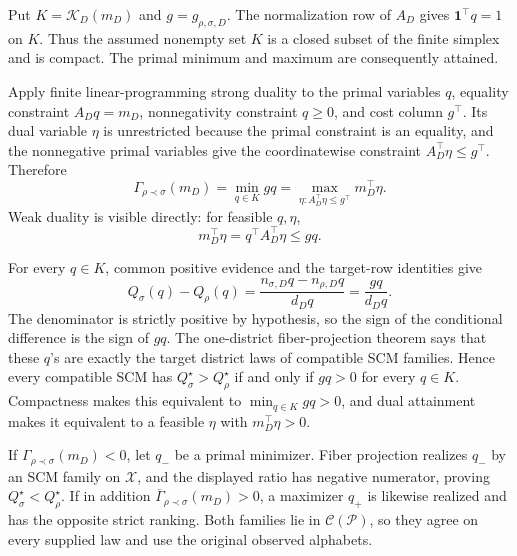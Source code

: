 Put \(K=\mathcal K_D(m_D)\) and \(g=g_{\rho,\sigma,D}\).  The normalization row of \(A_D\) gives \(\mathbf 1^\top q=1\) on \(K\).  Thus the assumed nonempty set \(K\) is a closed subset of the finite simplex and is compact.  The primal minimum and maximum are consequently attained.

Apply finite linear-programming strong duality to the primal variables \(q\), equality constraint \(A_Dq=m_D\), nonnegativity constraint \(q\geq0\), and cost column \(g^\top\).  Its dual variable \(\eta\) is unrestricted because the primal constraint is an equality, and the nonnegative primal variables give the coordinatewise constraint \(A_D^\top\eta\leq g^\top\).  Therefore
\[
 \Gamma_{\rho\prec\sigma}(m_D)
 =\min_{q\in K}gq
 =\max_{\eta:A_D^\top\eta\leq g^\top}m_D^\top\eta.
\]
Weak duality is visible directly: for feasible \(q,\eta\),
\[
 m_D^\top\eta=q^\top A_D^\top\eta\leq gq.
\]

For every \(q\in K\), common positive evidence and the target-row identities give
\[
 Q_\sigma(q)-Q_\rho(q)
 =\frac{n_{\sigma,D}q-n_{\rho,D}q}{d_Dq}
 =\frac{gq}{d_Dq}.
\]
The denominator is strictly positive by hypothesis, so the sign of the conditional difference is the sign of \(gq\).  The one-district fiber-projection theorem says that these \(q\)'s are exactly the target district laws of compatible SCM families.  Hence every compatible SCM has \(Q_\sigma^\star>Q_\rho^\star\) if and only if \(gq>0\) for every \(q\in K\).  Compactness makes this equivalent to \(\min_{q\in K}gq>0\), and dual attainment makes it equivalent to a feasible \(\eta\) with \(m_D^\top\eta>0\).

If \(\Gamma_{\rho\prec\sigma}(m_D)<0\), let \(q_-\) be a primal minimizer.  Fiber projection realizes \(q_-\) by an SCM family on \(\mathcal X\), and the displayed ratio has negative numerator, proving \(Q_\sigma^\star<Q_\rho^\star\).  If in addition \(\overline\Gamma_{\rho\prec\sigma}(m_D)>0\), a maximizer \(q_+\) is likewise realized and has the opposite strict ranking.  Both families lie in \(\mathcal C(\mathcal P)\), so they agree on every supplied law and use the original observed alphabets.
